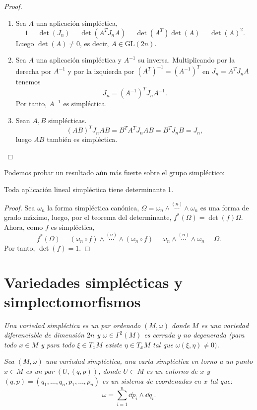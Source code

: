 \begin{proof}\leavevmode
  \begin{enumerate}
    \item Sea $A$ una aplicación simpléctica,
      \[
	1= \det(J_n) = \det(A^T J_n A) = \det(A^T)\det(A) = \det(A)^2.
      \]
      Luego $\det(A) \neq 0$, es decir, $A \in \mathrm{GL}(2n)$.
    \item Sea $A$ una aplicación simpléctica y $A^{-1}$ su inversa. Multiplicando por la derecha por $A^{-1}$ y por la izquierda por $(A^T)^{-1}=(A^{-1})^T$ en $J_n=A^T J_n A$ tenemos 
      \[
	J_n = (A^{-1})^T J_n A^{-1}.
      \]
      Por tanto, $A^{-1}$ es simpléctica.
    \item Sean $A, B$ simplécticas.
      \[
	(AB)^T J_n AB = B^T A^T J_n A B = B^T J_n B = J_n,
      \]
      luego $AB$ también es simpléctica.
  \end{enumerate}
\end{proof}

Podemos probar un resultado aún más fuerte sobre el grupo simpléctico:
\begin{prop}
  Toda aplicación lineal simpléctica tiene determinante 1.
\end{prop}
\begin{proof}
  Sea $\omega_n$ la forma simpléctica canónica, $\Omega=\omega_n \wedge \overset{(n)}{\cdots} \wedge \omega_n$ es una forma de grado máximo, luego, por el teorema del determinante, $f^*(\Omega)=\det(f) \Omega$. Ahora, como $f$ es simpléctica, 
  \begin{equation*}
    f^*(\Omega) = (\omega_n \circ f) \wedge \overset{(n)}{\cdots} \wedge (\omega_n \circ f)=\omega_n \wedge \overset{(n)}{\cdots} \wedge \omega_n = \Omega.
  \end{equation*}
  Por tanto, $\det(f)=1$.
\end{proof}
\section{Variedades simplécticas y simplectomorfismos}\label{3}
\begin{defn}
  \em
  Una \emph{variedad simpléctica} es un par ordenado $(M,\omega)$ donde $M$ es una variedad diferenciable de dimensión $2n$ y $\omega \in \Gamma^2(M)$ es cerrada y no degenerada (para todo $x \in M$ y para todo $\xi \in T_xM$ existe $\eta \in T_xM$ tal que $\omega(\xi,\eta)\neq0)$. 
\end{defn}
\begin{defn}
  \em
  Sea $(M,\omega)$ una variedad simpléctica, una \emph{carta simpléctica en torno a un punto $x \in M$} es un par $(U,(q,p))$, donde $U\subset M$ es un entorno de $x$ y $(q,p)=(q_1,\dots,q_n,p_1,\dots,p_n)$ es un sistema de coordenadas en $x$ tal que:
\begin{equation}
  \omega= \sum_{i=1}^n \dd p_i \wedge \dd q_i.
  \label{forma}
\end{equation}
\end{defn}

